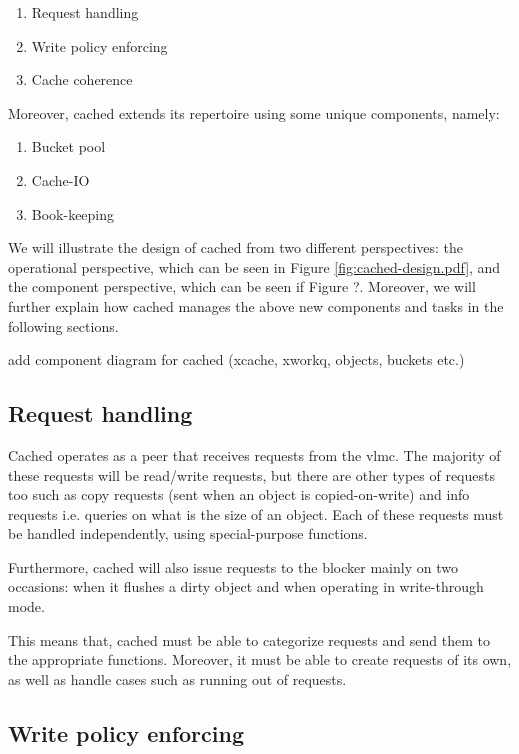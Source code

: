 \begin{enumerate}
	\item Request handling
	\item Write policy enforcing
	\item Cache coherence
\end{enumerate}

Moreover, cached extends its repertoire using some unique components, namely:

\begin{enumerate}
	\item Bucket pool
	\item Cache-IO
	\item Book-keeping
\end{enumerate}

We will illustrate the design of cached from two different perspectives: the 
operational perspective, which can be seen in Figure 
\ref{fig:cached-design.pdf}, and the component perspective, which can be seen 
if Figure ?. Moreover, we will further explain how cached manages the above new 
components and tasks in the following sections.


\fixme add component diagram for cached (xcache, xworkq, objects, buckets etc.)

\subsection{Request handling}

Cached operates as a peer that receives requests from the vlmc. The majority of 
these requests will be read/write requests, but there are other types of 
requests too such as copy requests (sent when an object is copied-on-write) and 
info requests i.e. queries on what is the size of an object. Each of these 
requests must be handled independently, using special-purpose functions.

Furthermore, cached will also issue requests to the blocker mainly on two 
occasions: when it flushes a dirty object and when operating in write-through 
mode.

This means that, cached must be able to categorize requests and send them to 
the appropriate functions. Moreover, it must be able to create requests of its 
own, as well as handle cases such as running out of requests.

\subsection{Write policy enforcing}\label{sec:cached-wcp-design}

